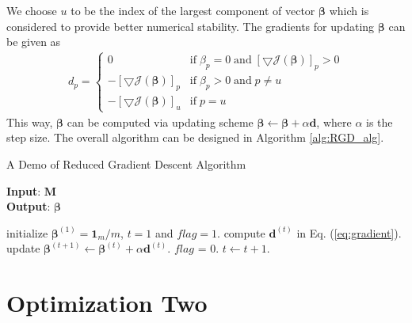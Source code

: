 \documentclass{article}
\begin{document}
We choose $u$ to be the index of the largest component of vector $\boldsymbol{\beta}$ which is considered to provide better numerical stability.
The gradients for updating $\boldsymbol{\beta}$ can be given as 
\begin{equation}\label{eq:gradient}
	\begin{split}
		d_p = \left\{
			\begin{array}{ll}
			0	&	\mathrm{if}\; \beta_p=0\; \mathrm{and}\; [\bigtriangledown \mathcal{J}(\boldsymbol{\beta})]_p > 0\\
			- [\bigtriangledown \mathcal{J}(\boldsymbol{\beta})]_p  &  \mathrm{if}\; \beta_p>0\; \mathrm{and}\; p\neq u\\
			- [\bigtriangledown \mathcal{J}(\boldsymbol{\beta})]_u  &  \mathrm{if}\; p=u
			\end{array} \right.
	\end{split}
\end{equation}
This way, $\boldsymbol{\beta}$ can be computed via updating scheme $\boldsymbol{\beta} \leftarrow \boldsymbol{\beta} + \alpha \mathbf{d}$, where $\alpha$ is the step size.
The overall algorithm can be designed in Algorithm \ref{alg:RGD_alg}.


\begin{algorithm}[h]
\caption{A Demo of Reduced Gradient Descent Algorithm}
\label{alg:RGD_alg}
\textbf{Input}: $\mathbf{M}$\\
\textbf{Output}: $\boldsymbol{\beta}$
\begin{algorithmic}[1] %
\STATE initialize $\boldsymbol{\beta}^{(1)}=\mathbf{1}_m/m$, $t=1$ and $flag=1$.
  \STATE compute $\mathbf{d}^{(t)}$ in Eq. (\ref{eq:gradient}).
  \STATE update $\boldsymbol{\beta}^{(t+1)} \leftarrow \boldsymbol{\beta}^{(t)} + \alpha \mathbf{d}^{(t)}$.
  		\STATE $flag$ = 0.
  \ENDIF
  \STATE $t \leftarrow t+1$.
\ENDWHILE
\end{algorithmic}
\end{algorithm}



\section{Optimization Two}
\end{document}
